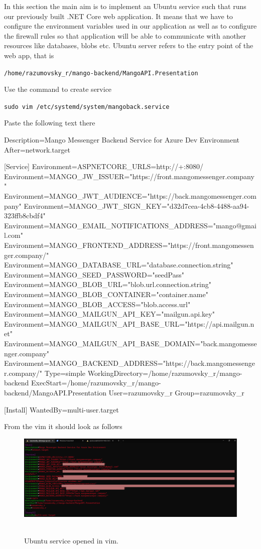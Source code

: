 In this section the main aim is to implement an Ubuntu service such that runs our previously built
.NET Core web application.
It means that we have to configure the environment variables used in our application
as well as to configure the firewall rules so that application will be able to communicate with
another resources like databases, blobs etc.
Ubuntu server refers to the entry point of the web app, that is
\begin{center}
    \texttt{/home/razumovsky\_r/mango-backend/MangoAPI.Presentation}
\end{center}
Use the command to create service
\begin{center}
    \texttt{sudo vim /etc/systemd/system/mangoback.service}
\end{center}
Paste the following text there
\begin{spverbatim}
[Unit]
    Description=Mango Messenger Backend Service for Azure Dev Environment
    After=network.target

    [Service]
    Environment=ASPNETCORE_URLS=http://+:8080/
    Environment=MANGO_JW_ISSUER="https://front.mangomessenger.company"
    Environment=MANGO_JWT_AUDIENCE="https://back.mangomessenger.company"
    Environment=MANGO_JWT_SIGN_KEY="d32d7cea-4cb8-4488-aa94-323ffb8cbdf4"
    Environment=MANGO_EMAIL_NOTIFICATIONS_ADDRESS="mango@gmail.com"
    Environment=MANGO_FRONTEND_ADDRESS="https://front.mangomessenger.company/"
    Environment=MANGO_DATABASE_URL="database.connection.string"
    Environment=MANGO_SEED_PASSWORD="seedPass"
    Environment=MANGO_BLOB_URL="blob.url.connection.string"
    Environment=MANGO_BLOB_CONTAINER="container.name"
    Environment=MANGO_BLOB_ACCESS="blob.access.url"
    Environment=MANGO_MAILGUN_API_KEY="mailgun.api.key"
    Environment=MANGO_MAILGUN_API_BASE_URL="https://api.mailgun.net"
    Environment=MANGO_MAILGUN_API_BASE_DOMAIN="back.mangomessenger.company"
    Environment=MANGO_BACKEND_ADDRESS="https://back.mangomessenger.company/"
    Type=simple
    WorkingDirectory=/home/razumovsky_r/mango-backend
    ExecStart=/home/razumovsky_r/mango-backend/MangoAPI.Presentation
    User=razumovsky_r
    Group=razumovsky_r

    [Install]
    WantedBy=multi-user.target
\end{spverbatim}
From the vim it should look as follows
\begin{figure}[H]
    \centering
    \includegraphics[width=1\textwidth]{img/05_ubuntu_service_vim}
    ~\caption{Ubuntu service opened in vim.}\label{fig:figure13}
\end{figure}
